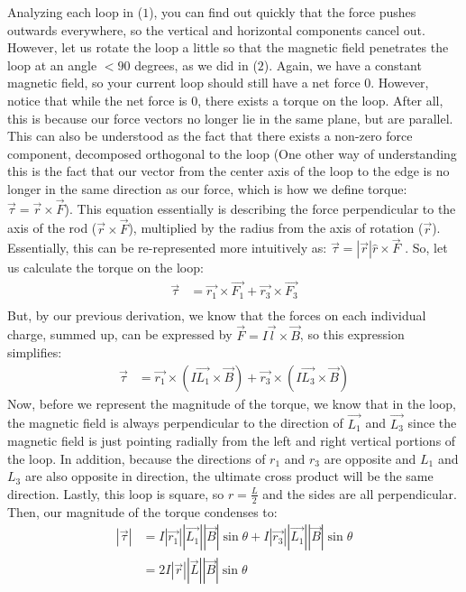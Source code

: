 \documentclass{article}
\begin{document}
Analyzing each loop in ($1$), you can find out quickly that the force pushes outwards everywhere, so the vertical and horizontal components cancel out. However, let us rotate the loop a little so that the magnetic field penetrates the loop at an angle $< 90$ degrees, as we did in ($2$). Again, we have a constant magnetic field, so your current loop should still have a net force $0$. However, notice that while the net force is $0$, there exists a torque on the loop. After all, this is because our force vectors no longer lie in the same plane, but are parallel. This can also be understood as the fact that there exists a non-zero force component, decomposed orthogonal to the loop (One other way of understanding this is the fact that our vector from the center axis of the loop to the edge is no longer in the same direction as our force, which is how we define torque: $\vec{\tau} = \vec{r}\times\vec{F}$). This equation essentially is describing the force perpendicular to the axis of the rod ($\vec{r}\times\vec{F}$), multiplied by the radius from the axis of rotation ($\vec{r}$). Essentially, this can be re-represented more intuitively as: $\vec{\tau} = |\vec{r}|\hat{r}\times\vec{F}$ . So, let us calculate the torque on the loop:
\begin{align*}
\vec{\tau} &= \vec{r_1}\times\vec{F_\text{1}} + \vec{r_3}\times\vec{F_\text{3}}\\
\end{align*}
But, by our previous derivation, we know that the forces on each individual charge, summed up, can be expressed by $\vec{F} = I\vec{l}\times\vec{B}$, so this expression simplifies:
\begin{align*}
\vec{\tau} &= \vec{r_1}\times(I\vec{L_1}\times\vec{B}) + \vec{r_3}\times (I\vec{L_3}\times\vec{B})
\end{align*}
Now, before we represent the magnitude of the torque, we know that in the loop, the magnetic field is always perpendicular to the direction of $\vec{L_1}$ and $\vec{L_3}$ since the magnetic field is just pointing radially from the left and right vertical portions of the loop. In addition, because the directions of $r_1$ and $r_3$ are opposite and $L_1$ and $L_3$ are also opposite in direction, the ultimate cross product will be the same direction. Lastly, this loop is square, so $r = \frac{L}{2}$ and the sides are all perpendicular. Then, our magnitude of the torque condenses to:
\begin{align*}
|\vec{\tau}| &= I|\vec{r_1}||\vec{L_1}||\vec{B}|\sin{\theta} + I|\vec{r_3}||\vec{L_1}||\vec{B}|\sin{\theta}\\
&= 2I|\vec{r}||\vec{L}||\vec{B}|\sin{\theta}
\end{align*}
\end{document}
